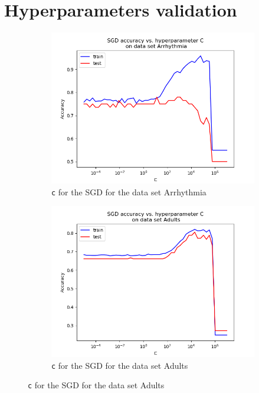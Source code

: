 \documentclass{article}
\begin{document}
\section{Hyperparameters validation}
\label{appendix-hyperparams}

\begin{figure}[H]
	\centering
	\begin{subfigure}[t]{0.45\linewidth}
		\includegraphics[width=\linewidth]{arrhythmia_sgd_c.png}
		\caption{\texttt{c} for the SGD for the data set Arrhythmia}
	\end{subfigure}
	\begin{subfigure}[t]{0.45\linewidth}
		\includegraphics[width=\linewidth]{adults_sgd_c.png}
		\caption{\texttt{c} for the SGD for the data set Adults}
	\end{subfigure}


\end{figure}
\end{document}
